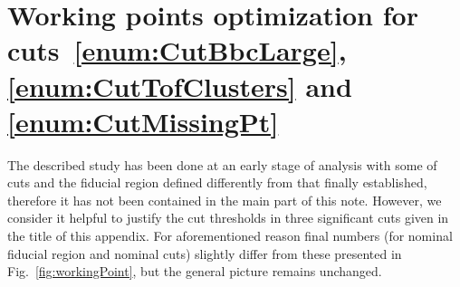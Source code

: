 
\chapter{Working points optimization for cuts~\ref{enum:CutBbcLarge}, \ref{enum:CutTofClusters} and \ref{enum:CutMissingPt}}\label{appendix:workingPoint}

The described study has been done at an early stage of analysis with some of cuts and the fiducial region defined differently from that finally established, therefore it has not been contained in the main part of this note. However, we consider it helpful to justify the cut thresholds in three significant cuts given in the title of this appendix. For aforementioned reason final numbers (for nominal fiducial region and nominal cuts) slightly differ from these presented in Fig.~\ref{fig:workingPoint}, but the general picture remains unchanged.

